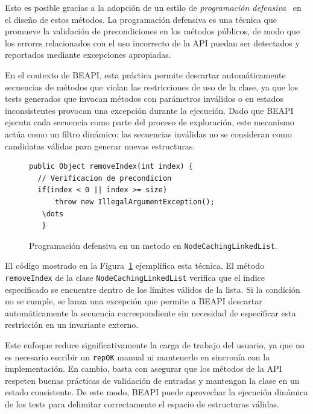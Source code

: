 Esto es posible gracias a la adopción de un estilo de \emph{programación defensiva}~\cite{Liskov00} en el diseño de estos métodos. 
La programación defensiva es una técnica que promueve la validación de precondiciones en los métodos públicos, de modo que los errores 
relacionados con el uso incorrecto de la API puedan ser detectados y reportados mediante excepciones apropiadas.

En el contexto de \textsf{BEAPI}, esta práctica permite descartar automáticamente secuencias de métodos que violan las restricciones de uso 
de la clase, ya que los tests generados que invocan métodos con parámetros inválidos o en estados inconsistentes provocan una excepción 
durante la ejecución. Dado que \textsf{BEAPI} ejecuta cada secuencia como parte del proceso de exploración, este mecanismo actúa 
como un filtro dinámico: las secuencias inválidas no se consideran como candidatas válidas para generar nuevas estructuras.

\begin{figure}[!htb]
\begin{lstlisting}
public Object removeIndex(int index) {
  // Verificacion de precondicion
  if(index < 0 || index >= size)
      throw new IllegalArgumentException();  
   \dots
   }
\end{lstlisting}
\caption{Programación defensiva en un metodo en \texttt{NodeCachingLinkedList}.}
\label{fig:algoProgDefensiva}
\end{figure}

El código mostrado en la Figura~\ref{fig:algoProgDefensiva} ejemplifica esta técnica. 
El método \texttt{removeIndex} de la clase \texttt{NodeCachingLinkedList} verifica que el índice especificado se encuentre dentro de los límites válidos de la lista. 
Si la condición no se cumple, se lanza una excepción que permite a \textsf{BEAPI} descartar automáticamente la secuencia correspondiente 
sin necesidad de especificar esta restricción en un invariante externo.

Este enfoque reduce significativamente la carga de trabajo del usuario, ya que no es necesario escribir un \texttt{repOK} manual ni mantenerlo 
en sincronía con la implementación. En cambio, basta con asegurar que los métodos de la API respeten buenas prácticas de validación 
de entradas y mantengan la clase en un estado consistente. 
De este modo, \textsf{BEAPI} puede aprovechar la ejecución dinámica de los tests para delimitar correctamente el espacio de estructuras válidas.


